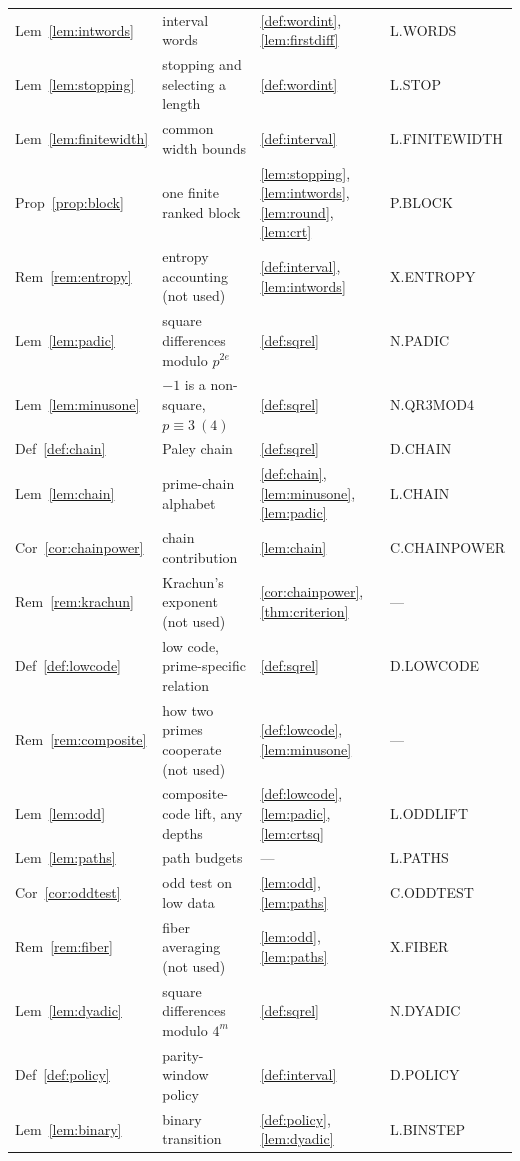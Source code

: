 \documentclass[11pt]{article}
\theoremstyle{definition}
\theoremstyle{remark}
\begin{document}
{\begin{longtable}{@{}p{2.3cm}p{4.9cm}p{4.5cm}>{\footnotesize\ttfamily}p{2.9cm}@{}}
Lem~\ref{lem:intwords} & interval words & \ref{def:wordint}, \ref{lem:firstdiff} & L.WORDS\\
Lem~\ref{lem:stopping} & stopping and selecting a length & \ref{def:wordint} & L.STOP\\
Lem~\ref{lem:finitewidth} & common width bounds & \ref{def:interval} & L.FINITEWIDTH\\
Prop~\ref{prop:block} & one finite ranked block & \ref{lem:stopping}, \ref{lem:intwords}, \ref{lem:round}, \ref{lem:crt} & P.BLOCK\\
Rem~\ref{rem:entropy} & entropy accounting (not used) & \ref{def:interval}, \ref{lem:intwords} & X.ENTROPY\\
Lem~\ref{lem:padic} & square differences modulo $p^{2e}$ & \ref{def:sqrel} & N.PADIC\\
Lem~\ref{lem:minusone} & $-1$ is a non-square, $p\equiv3\ (4)$ & \ref{def:sqrel} & N.QR3MOD4\\
Def~\ref{def:chain} & Paley chain & \ref{def:sqrel} & D.CHAIN\\
Lem~\ref{lem:chain} & prime-chain alphabet & \ref{def:chain}, \ref{lem:minusone}, \ref{lem:padic} & L.CHAIN\\
Cor~\ref{cor:chainpower} & chain contribution & \ref{lem:chain} & C.CHAINPOWER\\
Rem~\ref{rem:krachun} & Krachun's exponent (not used) & \ref{cor:chainpower}, \ref{thm:criterion} & ---\\
Def~\ref{def:lowcode} & low code, prime-specific relation & \ref{def:sqrel} & D.LOWCODE\\
Rem~\ref{rem:composite} & how two primes cooperate (not used) & \ref{def:lowcode}, \ref{lem:minusone} & ---\\
Lem~\ref{lem:odd} & composite-code lift, any depths & \ref{def:lowcode}, \ref{lem:padic}, \ref{lem:crtsq} & L.ODDLIFT\\
Lem~\ref{lem:paths} & path budgets & --- & L.PATHS\\
Cor~\ref{cor:oddtest} & odd test on low data & \ref{lem:odd}, \ref{lem:paths} & C.ODDTEST\\
Rem~\ref{rem:fiber} & fiber averaging (not used) & \ref{lem:odd}, \ref{lem:paths} & X.FIBER\\
Lem~\ref{lem:dyadic} & square differences modulo $4^m$ & \ref{def:sqrel} & N.DYADIC\\
Def~\ref{def:policy} & parity-window policy & \ref{def:interval} & D.POLICY\\
Lem~\ref{lem:binary} & binary transition & \ref{def:policy}, \ref{lem:dyadic} & L.BINSTEP\\

\end{longtable}}
\end{document}
